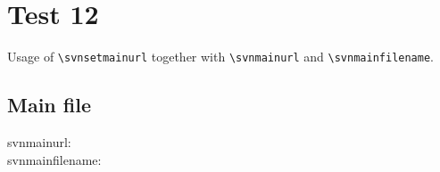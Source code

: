 \documentclass[12pt]{report}
\begin{document}
\chapter{Test 12}
Usage of \verb+\svnsetmainurl+ together with \verb+\svnmainurl+ and \verb+\svnmainfilename+.\\

\section{Main file}

\noindent
svnmainurl: \svnnolinkurl{\svnmainurl} \\
svnmainfilename: \svnnolinkurl{\svnmainfilename} \\


\end{document}
